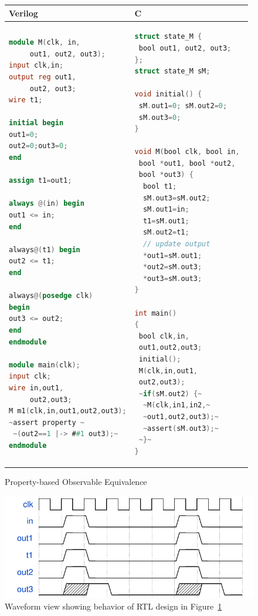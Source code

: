 %
\begin{figure}[htbp]
\scriptsize
\begin{tabular}{l|l}
\hline
Verilog & C \\
\hline
\begin{lstlisting}[mathescape=true,language=Verilog,style=base]
module M(clk, in, 
     out1, out2, out3);
input clk,in;
output reg out1, 
     out2, out3;
wire t1;

initial begin
out1=0; 
out2=0;out3=0;
end

assign t1=out1;

always @(in) begin
out1 <= in;
end

always@(t1) begin
out2 <= t1;
end

always@(posedge clk) 
begin
out3 <= out2;
end
endmodule

module main(clk);
input clk;
wire in,out1,
     out2,out3;
M m1(clk,in,out1,out2,out3);
~assert property ~
 ~(out2==1 |-> ##1 out3);~
endmodule
\end{lstlisting}
&
\begin{lstlisting}[mathescape=true,language=C,style=base]
struct state_M {
 bool out1, out2, out3; 
};
struct state_M sM;

void initial() {
 sM.out1=0; sM.out2=0; 
 sM.out3=0;
}

void M(bool clk, bool in, 
 bool *out1, bool *out2, 
 bool *out3) {
  bool t1;
  sM.out3=sM.out2;
  sM.out1=in;
  t1=sM.out1;
  sM.out2=t1;
  // update output  
  *out1=sM.out1;
  *out2=sM.out3;
  *out3=sM.out3;
}
 
int main()
{
 bool clk,in,
 out1,out2,out3;
 initial();
 M(clk,in,out1,
 out2,out3);
 ~if(sM.out2) {~
  ~M(clk,in1,in2,~
  ~out1,out2,out3);~
  ~assert(sM.out3);~
 ~}~
}
\end{lstlisting}
\\
\hline
\end{tabular}
\caption{Property-based Observable Equivalence}
\label{figure:equivalence}
\end{figure}
%
\begin{figure}[t]
\begin{center}
  \includegraphics[width=\columnwidth]{figures/wavedrom.pdf}%
  \caption{Waveform view showing behavior of RTL design in
  Figure~\ref{figure:equivalence}} 
\label{fig:waveform}
\end{center}
\end{figure}


